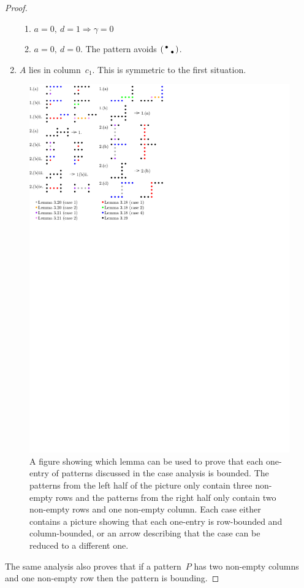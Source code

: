 \begin{proof}
\begin{enumerate}
\begin{enumerate}
		\item $a=0,\ d=1\Rightarrow\gamma=0$
		\item $a=0,\ d=0$. The pattern avoids $\left(\begin{smallmatrix}\bullet& \\ &\bullet\end{smallmatrix}\right)$.
	\end{enumerate}
\item $A$ lies in column~$c_1$. This is symmetric to the first situation.
\end{enumerate}
\begin{figure}[!ht]
	\centering
	\includegraphics[width=120mm]{img/caseana.pdf}
	\caption{A figure showing which lemma can be used to prove that each one-entry of patterns discussed in the case analysis is bounded. The patterns from the left half of the picture only contain three non-empty rows and the patterns from the right half only contain two non-empty rows and one non-empty column. Each case either contains a picture showing that each one-entry is row-bounded and column-bounded, or an arrow describing that the case can be reduced to a different one.}
	\label{fig:pictproof1}
\end{figure}
The same analysis also proves that if a pattern~$P$ has two non-empty columns and one non-empty row then the pattern is bounding.
\end{proof}

